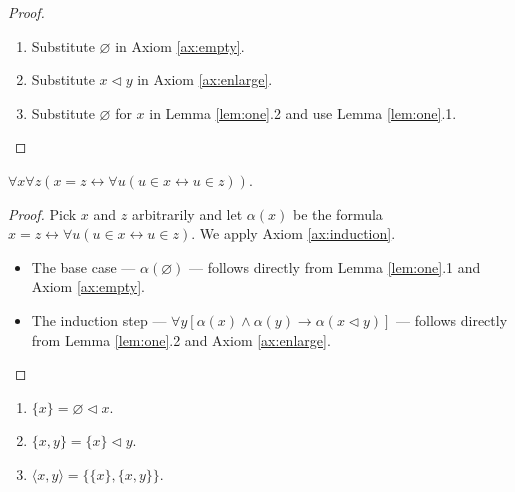 \begin{proof}
    \leanok
    \leavevmode
    \begin{enumerate}
        \item Substitute $\varnothing$ in Axiom \ref{ax:empty}.
        \item Substitute $x \lhd y$ in Axiom \ref{ax:enlarge}.
        \item Substitute $\varnothing$ for $x$ in Lemma \ref{lem:one}.2 and use Lemma \ref{lem:one}.1.
    \end{enumerate}
\end{proof}

\begin{theorem}
    \label{thm:exten_prop}
    \leanok
    $\forall x \forall z (x=z \leftrightarrow \forall u (u \in x \leftrightarrow u \in z))$.
\end{theorem}

\begin{proof}
    \leanok
    Pick $x$ and $z$ arbitrarily and let $\alpha (x)$ be the formula $x=z \leftrightarrow \forall u (u \in x \leftrightarrow u \in z)$.
    We apply Axiom \ref{ax:induction}.
    \begin{itemize}
        \item The base case — $\alpha (\varnothing)$ — follows directly from Lemma \ref{lem:one}.1 and Axiom \ref{ax:empty}.
        \item The induction step — $\forall y[\alpha(x) \land \alpha(y) \rightarrow \alpha(x \lhd y)]$ — 
        follows directly from Lemma \ref{lem:one}.2 and Axiom \ref{ax:enlarge}.
    \end{itemize}
\end{proof}

\begin{notation*}
    \label{not:single_pairs}
    \leanok
    \leavevmode \normalfont
    \begin{enumerate}
        \item $\{x\} = \varnothing \lhd x$.
        \item $\{x,y\} = \{x\} \lhd y$.
        \item $\langle x,y\rangle = \{\{x\}, \{x,y\}\}$.
    \end{enumerate}
\end{notation*}

